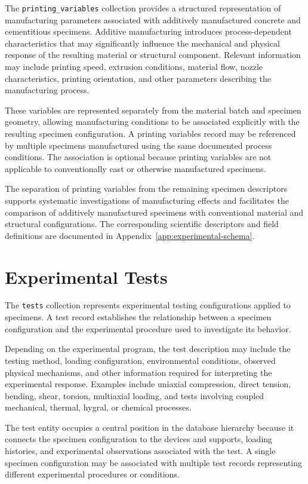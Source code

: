 The \texttt{printing\_variables} collection
provides a structured representation of
manufacturing parameters associated with
additively manufactured concrete and
cementitious specimens.
Additive manufacturing introduces
process-dependent characteristics that
may significantly influence the
mechanical and physical response of
the resulting material or structural
component.
Relevant information may include
printing speed, extrusion conditions,
material flow, nozzle characteristics,
printing orientation, and other
parameters describing the manufacturing
process.

These variables are represented
separately from the material batch
and specimen geometry, allowing
manufacturing conditions to be
associated explicitly with the
resulting specimen configuration.
A printing variables record may be
referenced by multiple specimens
manufactured using the same
documented process conditions.
The association is optional because
printing variables are not applicable
to conventionally cast or otherwise
manufactured specimens.

The separation of printing variables
from the remaining specimen descriptors
supports systematic investigations
of manufacturing effects and facilitates
the comparison of additively manufactured
specimens with conventional material
and structural configurations.
The corresponding scientific descriptors
and field definitions are documented
in Appendix~\ref{app:experimental-schema}.


\section{Experimental Tests}

The \texttt{tests} collection represents
experimental testing configurations
applied to specimens.
A test record establishes the
relationship between a specimen
configuration and the experimental
procedure used to investigate its
behavior.

Depending on the experimental program,
the test description may include the
testing method, loading configuration,
environmental conditions, observed
physical mechanisms, and other
information required for interpreting
the experimental response.
Examples include uniaxial compression,
direct tension, bending, shear,
torsion, multiaxial loading, and
tests involving coupled mechanical,
thermal, hygral, or chemical processes.

The test entity occupies a central
position in the database hierarchy
because it connects the specimen
configuration to the devices and
supports, loading histories, and
experimental observations associated
with the test.
A single specimen configuration
may be associated with multiple
test records representing different
experimental procedures or conditions.

